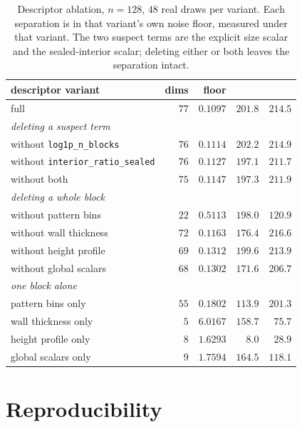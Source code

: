 \begin{table}[!htb]
\centering
\small
\caption{Descriptor ablation, $n{=}128$, $48$ real draws per variant. Each
separation is in that variant's own noise floor, measured under that variant.
The two suspect terms are the explicit size scalar and the sealed-interior
scalar; deleting either or both leaves the separation intact.}
\label{tab:descriptor-ablation}
\setlength{\tabcolsep}{5pt}
\begin{tabular}{lrrrr}
\toprule
descriptor variant & dims & floor & \solidify{} & \growshell{} \\
\midrule
full                              & $77$ & $0.1097$ & $\mathbf{201.8}$ & $214.5$ \\
\midrule
\multicolumn{5}{l}{\emph{deleting a suspect term}} \\
without \texttt{log1p\_n\_blocks}       & $76$ & $0.1114$ & $202.2$ & $214.9$ \\
without \texttt{interior\_ratio\_sealed}& $76$ & $0.1127$ & $197.1$ & $211.7$ \\
without both                            & $75$ & $0.1147$ & $197.3$ & $211.9$ \\
\midrule
\multicolumn{5}{l}{\emph{deleting a whole block}} \\
without pattern bins    & $22$ & $0.5113$ & $198.0$ & $120.9$ \\
without wall thickness  & $72$ & $0.1163$ & $176.4$ & $216.6$ \\
without height profile  & $69$ & $0.1312$ & $199.6$ & $213.9$ \\
without global scalars  & $68$ & $0.1302$ & $171.6$ & $206.7$ \\
\midrule
\multicolumn{5}{l}{\emph{one block alone}} \\
pattern bins only       & $55$ & $0.1802$ & $113.9$ & $201.3$ \\
wall thickness only     & $5$  & $6.0167$ & $158.7$ & $75.7$ \\
height profile only     & $8$  & $1.6293$ & $8.0$   & $28.9$ \\
global scalars only     & $9$  & $1.7594$ & $164.5$ & $118.1$ \\
\bottomrule
\end{tabular}
\end{table}


\section{Reproducibility}
\label{app:repro}

